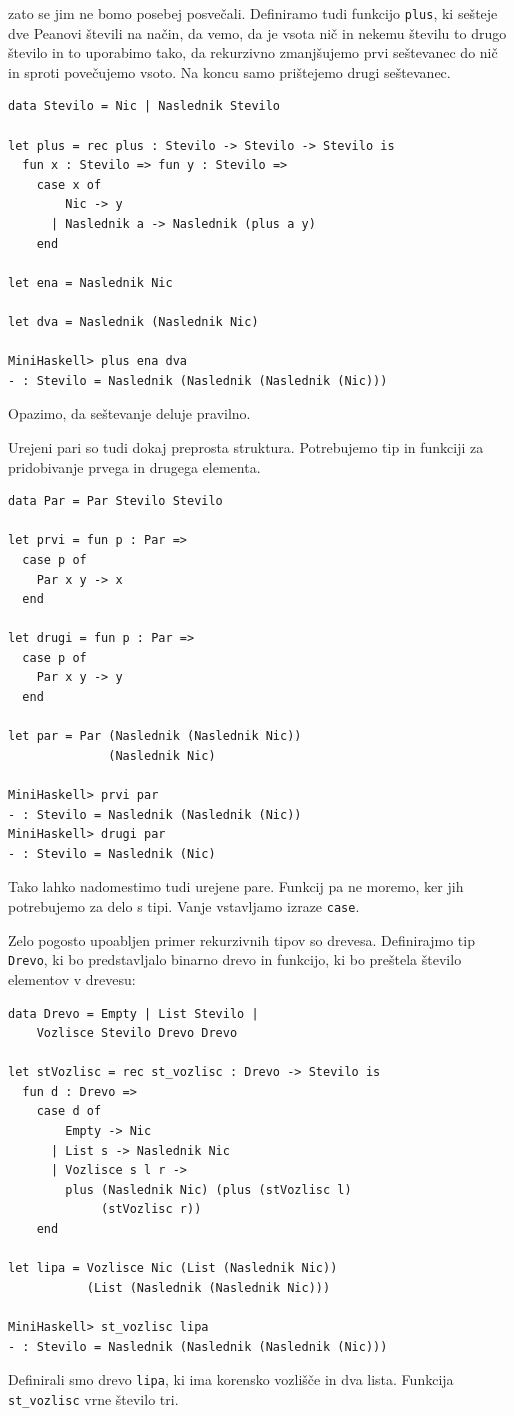 \documentclass[a4paper,12pt,openright]{book}
\begin{document}
zato se jim ne bomo posebej posvečali. Definiramo tudi funkcijo \lstinline{plus}, ki sešteje dve Peanovi števili na način, da vemo, da je vsota nič in nekemu številu to drugo število in to uporabimo tako, da rekurzivno 
zmanjšujemo prvi seštevanec do nič in sproti povečujemo vsoto. Na koncu samo prištejemo drugi seštevanec.
\begin{lstlisting}
data Stevilo = Nic | Naslednik Stevilo

let plus = rec plus : Stevilo -> Stevilo -> Stevilo is
  fun x : Stevilo => fun y : Stevilo =>
    case x of
        Nic -> y
      | Naslednik a -> Naslednik (plus a y)
    end

let ena = Naslednik Nic

let dva = Naslednik (Naslednik Nic)

MiniHaskell> plus ena dva
- : Stevilo = Naslednik (Naslednik (Naslednik (Nic)))
\end{lstlisting}
Opazimo, da seštevanje deluje pravilno. 

Urejeni pari so tudi dokaj preprosta struktura. Potrebujemo tip in funkciji za pridobivanje prvega in drugega elementa.
\begin{lstlisting}
data Par = Par Stevilo Stevilo

let prvi = fun p : Par =>
  case p of 
    Par x y -> x
  end

let drugi = fun p : Par =>
  case p of 
    Par x y -> y
  end

let par = Par (Naslednik (Naslednik Nic)) 
              (Naslednik Nic)

MiniHaskell> prvi par
- : Stevilo = Naslednik (Naslednik (Nic))
MiniHaskell> drugi par
- : Stevilo = Naslednik (Nic)
\end{lstlisting}
Tako lahko nadomestimo tudi urejene pare. Funkcij pa ne moremo, ker jih potrebujemo za delo s tipi. Vanje vstavljamo izraze \lstinline{case}. 

Zelo pogosto upoabljen primer rekurzivnih tipov so drevesa. Definirajmo tip \lstinline{Drevo}, ki bo predstavljalo binarno drevo in funkcijo, ki bo preštela število elementov v drevesu:
\begin{lstlisting}	
data Drevo = Empty | List Stevilo | 
    Vozlisce Stevilo Drevo Drevo

let stVozlisc = rec st_vozlisc : Drevo -> Stevilo is
  fun d : Drevo =>
    case d of
        Empty -> Nic
      | List s -> Naslednik Nic
      | Vozlisce s l r ->
        plus (Naslednik Nic) (plus (stVozlisc l) 
             (stVozlisc r))
    end

let lipa = Vozlisce Nic (List (Naslednik Nic)) 
           (List (Naslednik (Naslednik Nic)))

MiniHaskell> st_vozlisc lipa
- : Stevilo = Naslednik (Naslednik (Naslednik (Nic)))
\end{lstlisting}
Definirali smo drevo \lstinline{lipa}, ki ima korensko vozlišče in dva lista. Funkcija \lstinline{st_vozlisc} vrne število tri.
\end{document}
